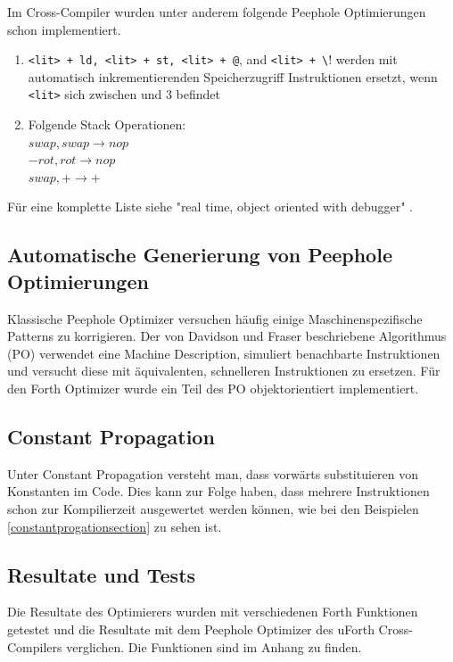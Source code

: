 Im Cross-Compiler wurden unter anderem folgende Peephole Optimierungen schon implementiert.

\begin{enumerate}
  \item \verb!<lit> + ld, <lit> + st, <lit> + @!, and \verb!<lit> + \!! werden mit automatisch inkrementierenden Speicherzugriff Instruktionen ersetzt, wenn \verb!<lit>! sich zwischen  und 3 befindet
  \item Folgende Stack Operationen: \\
				$swap, swap \rightarrow nop$\\
				$-rot, rot \rightarrow nop$\\
				$swap, + \rightarrow +$\\

\end{enumerate}

Für eine komplette Liste siehe "real time, object oriented with debugger" \cite{uforth}.

\newpage
\subsection{Automatische Generierung von Peephole Optimierungen}

Klassische Peephole Optimizer versuchen häufig einige Maschinenspezifische Patterns zu korrigieren. Der von Davidson und Fraser\cite{peepdavidson} beschriebene Algorithmus (PO) verwendet eine Machine Description, simuliert benachbarte Instruktionen und versucht diese mit äquivalenten, schnelleren Instruktionen zu ersetzen. Für den Forth Optimizer wurde ein Teil des PO objektorientiert implementiert.

\subsection{Constant Propagation}
Unter Constant Propagation versteht man, dass vorwärts substituieren von Konstanten im Code. Dies kann zur Folge haben, dass mehrere Instruktionen schon zur Kompilierzeit ausgewertet werden können, wie bei den Beispielen \ref{constantprogationsection} zu sehen ist.

\subsection{Resultate und Tests}
Die Resultate des Optimierers wurden mit verschiedenen Forth Funktionen getestet und die Resultate mit dem Peephole Optimizer des uForth Cross-Compilers verglichen. Die Funktionen sind im Anhang zu finden.

